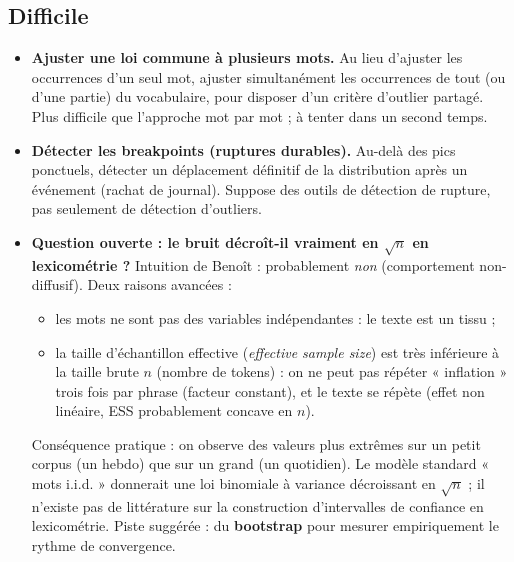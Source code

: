 \documentclass[12pt,a4paper]{article}
\begin{document}
\subsection*{Difficile}

\begin{itemize}
    \item \textbf{Ajuster une loi commune à plusieurs mots.} Au lieu d'ajuster
    les occurrences d'un seul mot, ajuster simultanément les occurrences de tout
    (ou d'une partie) du vocabulaire, pour disposer d'un critère d'outlier partagé.
    Plus difficile que l'approche mot par mot ; à tenter dans un second temps.

    \item \textbf{Détecter les breakpoints (ruptures durables).} Au-delà des pics
    ponctuels, détecter un déplacement définitif de la distribution après un événement
    (rachat de journal). Suppose des outils de détection de rupture, pas seulement
    de détection d'outliers.

    \item \textbf{Question ouverte : le bruit décroît-il vraiment en $\sqrt{n}$ en
    lexicométrie ?} Intuition de Benoît : probablement \emph{non} (comportement
    non-diffusif). Deux raisons avancées :
    \begin{itemize}
        \item les mots ne sont pas des variables indépendantes : le texte est un tissu ;
        \item la taille d'échantillon effective (\emph{effective sample size}) est très
        inférieure à la taille brute $n$ (nombre de tokens) : on ne peut pas répéter
        « inflation » trois fois par phrase (facteur constant), et le texte se répète
        (effet non linéaire, ESS probablement concave en $n$).
    \end{itemize}
    Conséquence pratique : on observe des valeurs plus extrêmes sur un petit corpus
    (un hebdo) que sur un grand (un quotidien). Le modèle standard « mots i.i.d. »
    donnerait une loi binomiale à variance décroissant en $\sqrt{n}$ ; il n'existe pas
    de littérature sur la construction d'intervalles de confiance en lexicométrie.
    Piste suggérée : du \textbf{bootstrap} pour mesurer empiriquement le rythme de
    convergence.
\end{itemize}
\end{document}

